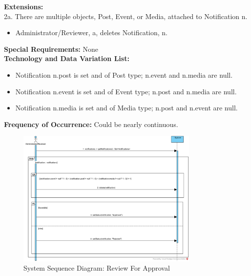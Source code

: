 \textbf{Extensions:} \\
2a. There are multiple objects, Post, Event, or Media, attached to Notification n.
\begin{itemize}
    \item Administrator/Reviewer, a, deletes Notification, n.
\end{itemize}
\textbf{Special Requirements:} None \\
\textbf{Technology and Data Variation List:}
\begin{itemize}
    \item Notification n.post is set and of Post type; n.event and n.media are null.
    \item Notification n.event is set and of Event type; n.post and n.media are null.
    \item Notification n.media is set and of Media type; n.post and n.event are null.
\end{itemize}
\textbf{Frequency of Occurrence:} Could be nearly continuous. \\

\begin{figure}[H]
    \centering
    \includegraphics[width=0.8\textwidth]{images/SSD-UC09-ReviewForApproval.png}
    \centering
    \caption{System Sequence Diagram: Review For Approval}
\end{figure}